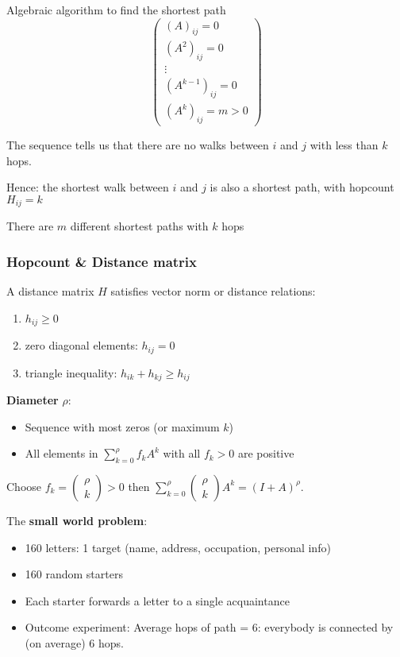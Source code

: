 Algebraic algorithm to find the shortest path
$$
\begin{pmatrix}
  (A)_{ij} = 0 \\
  (A^2)_{ij} = 0 \\
  \vdots \\
  (A^{k -1})_{ij} = 0 \\
  (A^k)_{ij} = m > 0
\end{pmatrix}
$$

The sequence tells us that there are no walks between $i$ and $j$ with less than $k$ hops.

Hence: the shortest walk between $i$ and $j$ is also a shortest path, with hopcount $H_{ij} = k$

There are $m$ different shortest paths with $k$ hops

\subsubsection{Hopcount \& Distance matrix}
A distance matrix $H$ satisfies vector norm or distance relations:
\begin{enumerate}
  \item $h_{ij} \ge 0$
  \item zero diagonal elements: $h_{ij} = 0$
  \item triangle inequality: $h_{ik} + h_{kj} \ge h_{ij}$
\end{enumerate}

\textbf{Diameter} $\rho$: 
\begin{itemize}
  \item Sequence with most zeros (or maximum $k$)
  \item All elements in $\sum_{k =0}^{\rho} f_k A^k$ with all $f_k > 0$ are positive
\end{itemize}

Choose $f_k = \begin{pmatrix}
  \rho \\ k
\end{pmatrix} > 0$
then $\sum_{k = 0}^{\rho} \begin{pmatrix}
  \rho \\ k
\end{pmatrix} A^k = (I + A)^{\rho}$.

The \textbf{small world problem}:
\begin{itemize}
  \item 160 letters: 1 target (name, address, occupation, personal info)
  \item 160 random starters
  \item Each starter forwards a letter to a single acquaintance
  \item Outcome experiment: Average hops of path = 6: everybody is connected by (on average) 6 hops.
\end{itemize}

